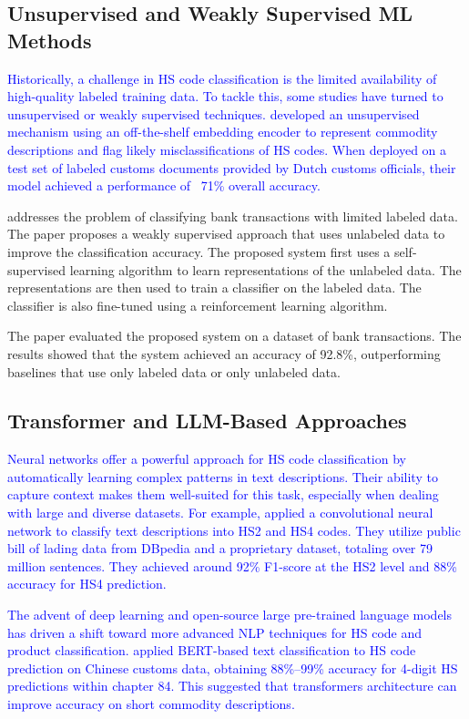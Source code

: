 \documentclass[mnsc,nonblindrev]{informs3} %
\begin{document}
\subsection{Unsupervised and Weakly Supervised ML Methods}

\textcolor{blue}{Historically, a challenge in HS code classification is the limited availability of high-quality labeled training data. To tackle this, some studies have turned to unsupervised or weakly supervised techniques. \citet{chenmachine2021} developed an unsupervised mechanism using an off-the-shelf embedding encoder to represent commodity descriptions and flag likely misclassifications of HS codes. When deployed on a test set of labeled customs documents provided by Dutch customs officials, their model achieved a performance of ~71\% overall accuracy.}


\citet{toran2023scalable} addresses the problem of classifying bank transactions with limited labeled data. The paper proposes a weakly supervised approach that uses unlabeled data to improve the classification accuracy. The proposed system first uses a self-supervised learning algorithm to learn representations of the unlabeled data. The representations are then used to train a classifier on the labeled data. The classifier is also fine-tuned using a reinforcement learning algorithm.

The paper evaluated the proposed system on a dataset of bank transactions. The results showed that the system achieved an accuracy of 92.8\%, outperforming baselines that use only labeled data or only unlabeled data.

\subsection{Transformer and LLM-Based Approaches}

\textcolor{blue}{Neural networks offer a powerful approach for HS code classification by automatically learning complex patterns in text descriptions. Their ability to capture context makes them well-suited for this task, especially when dealing with large and diverse datasets. For example, \citet{Luppes2019} applied a convolutional neural network to classify text descriptions into HS2 and HS4 codes. They utilize public bill of lading data from DBpedia and a proprietary dataset, totaling over 79 million sentences. They achieved around 92\% F1-score at the HS2 level and 88\% accuracy for HS4 prediction.}

\textcolor{blue}{The advent of deep learning and open-source large pre-trained language models has driven a shift toward more advanced NLP techniques for HS code and product classification. \citet{He2021} applied BERT-based text classification to HS code prediction on Chinese customs data, obtaining 88\%–99\% accuracy for 4-digit HS predictions within chapter 84. This suggested that transformers architecture can improve accuracy on short commodity descriptions.}
\end{document}
